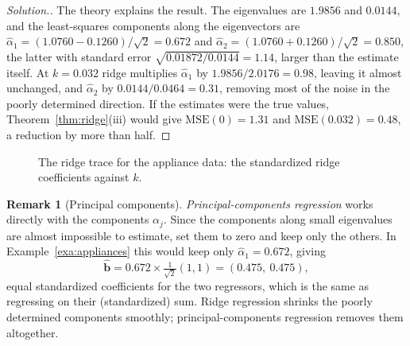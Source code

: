 \documentclass[11pt,a4paper]{article}
\numberwithin{equation}{section}
\theoremstyle{definition}
\newtheorem*{remark}{Remark}
\newenvironment{solution}
  {\renewcommand{\qedsymbol}{}\begin{proof}[\textit{Solution}.]}
  {\end{proof}}
\begin{document}
\begin{solution}
The theory explains the result. The eigenvalues are $1.9856$ and $0.0144$, and the least-squares components
along the eigenvectors are $\hat\alpha_1 = (1.0760 - 0.1260)/\sqrt2 = 0.672$ and
$\hat\alpha_2 = (1.0760 + 0.1260)/\sqrt2 = 0.850$, the latter with standard error
$\sqrt{0.01872/0.0144} = 1.14$, larger than the estimate itself. At $k = 0.032$ ridge multiplies $\hat\alpha_1$ by
$1.9856/2.0176 = 0.98$, leaving it almost unchanged, and $\hat\alpha_2$ by $0.0144/0.0464 = 0.31$, removing most
of the noise in the poorly determined direction. If the estimates were the true values,
Theorem~\ref{thm:ridge}(iii) would give $\mathrm{MSE}(0) = 1.31$ and $\mathrm{MSE}(0.032) = 0.48$, a reduction by more than
half.
\end{solution}

\begin{figure}[H]
\centering
{}
\caption{The ridge trace for the appliance data: the standardized ridge coefficients against $k$.}
\label{fig:ridge-trace}
\end{figure}

\begin{remark}[Principal components]
\emph{Principal-components regression} works directly with the components $\alpha_j$. Since the components along small
eigenvalues are almost impossible to estimate, set them to zero and keep only the others. In
Example~\ref{exa:appliances} this would keep only $\hat\alpha_1 = 0.672$, giving
\[
\hat{\mathbf{b}} = 0.672 \times \tfrac{1}{\sqrt2}(1, 1) = (0.475,\ 0.475) ,
\]
equal standardized coefficients for the two
regressors, which is the same as regressing on their (standardized) sum. Ridge regression shrinks the
poorly determined components smoothly; principal-components regression removes them altogether.
\end{remark}
\end{document}
